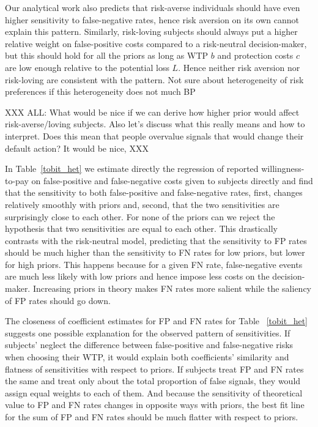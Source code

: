 \documentclass[12pt,a4paper]{article}
\newcommand{\agt}[1]{{\color{OliveGreen}#1}}
\newcommand{\aut}[1]{{\color{Red}#1}}
\begin{document}
Our analytical work also predicts that risk-averse individuals should have even higher sensitivity to false-negative rates, hence risk aversion on its own cannot explain this pattern. Similarly, risk-loving subjects should always put a higher relative weight on false-positive costs compared to a risk-neutral decision-maker, but this should hold for all the priors as long as WTP $b$ and protection costs $c$ are low enough relative to the potential loss $L$. Hence neither risk aversion nor risk-loving are consistent with the pattern. \aut{Not sure about heterogeneity of risk preferences if this heterogeneity does not much BP}

XXX \agt{ALL: What would be nice if we can derive how higher prior would affect risk-averse/loving subjects. Also let's discuss what this really means and how to interpret. Does this mean that people overvalue signals that would change their default action?} \aut{It would be nice, } XXX

\label{tobit_het}

In Table~\ref{tobit_het} we estimate directly the regression of reported willingness-to-pay on false-positive and false-negative costs given to subjects directly and find that the sensitivity to both false-positive and false-negative rates, first, changes relatively smoothly with priors and, second, that the two sensitivities are surprisingly close to each other. For none of the priors can we reject the hypothesis that two sensitivities are equal to each other. This drastically contrasts with the risk-neutral model, predicting that the sensitivity to FP rates should be much higher than the sensitivity to FN rates for low priors, but lower for high priors. This happens because for a given FN rate, false-negative events are much less likely with low priors and hence impose less costs on the decision-maker. Increasing priors in theory makes FN rates more salient while the saliency of FP rates should go down. 

The closeness of coefficient estimates for FP and FN rates for Table ~\ref{tobit_het} suggests one possible explanation for the observed pattern of sensitivities. If subjects' neglect the difference between false-positive and false-negative risks when choosing their WTP, it would explain both coefficients' similarity and flatness of sensitivities with respect to priors. If subjects treat FP and FN rates the same and treat only about the total proportion of false signals, they would assign equal weights to each of them. And because the sensitivity of theoretical value to FP and FN rates changes in opposite ways with priors, the best fit line for the sum of FP and FN rates should be much flatter with respect to priors.
\end{document}
